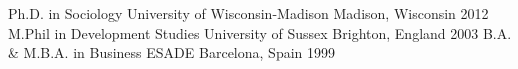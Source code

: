 \begin{cventries}
  \cventry
    {Ph.D. in Sociology}
    {University of Wisconsin-Madison}
    {Madison, Wisconsin}
    {2012}
    {}
  \cventry
    {M.Phil in Development Studies}
    {University of Sussex}
    {Brighton, England}
    {2003}
    {}
  \cventry
    {B.A. \& M.B.A. in Business}
    {ESADE}
    {Barcelona, Spain}
    {1999}
    {}
\end{cventries}
